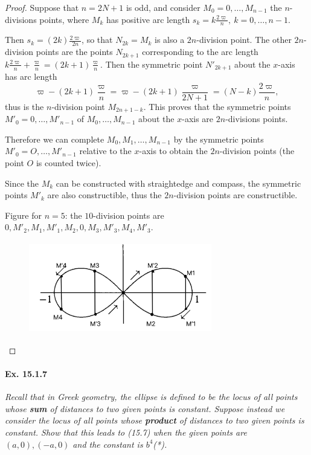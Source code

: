\documentclass[11pt,a4paper]{article}
\begin{document}
\begin{proof} Suppose that $n = 2N+1$ is odd, and consider $M_0=0, \ldots,M_{n-1}$  the $n$-divisions points, where $M_k$ has positive arc length $s_k = k \frac{2\varpi}{n},\ k=0,\ldots,n-1$.

Then $s_k = (2k) \frac{2\varpi}{2n}$, so that $N_{2k} = M_k$ is also a $2n$-division point. The other $2n$-division points are the points $N_{2k+1}$ corresponding to the arc length $k \frac{2\varpi}{n} + \frac{\varpi}{n} = (2k+1) \frac{\varpi}{n}$. Then the symmetric point $N'_{2k+1}$ about the $x$-axis has arc length 
$$\varpi - (2k+1) \frac{\varpi}{n} = \varpi - (2k+1) \frac{\varpi}{2N+1} = (N-k) \frac{2 \varpi}{n},$$
thus is the $n$-division point $M_{2n+1-k}$. This proves that the symmetric points $M'_0 = 0,\ldots,M'_{n-1}$  of $M_0,\ldots,M_{n-1}$ about the $x$-axis are $2n$-divisions points.


Therefore we can complete $M_0, M_1, \ldots,M_{n-1}$ by the symmetric points $M'_0 = O,\ldots,M'_{n-1}$ relative to the $x$-axis to obtain the $2n$-division points (the point $O$ is counted twice).

Since the $M_k$ can be constructed with straightedge and compass, the symmetric points $M'_k$ are also constructible, thus the $2n$-division points are constructible. 

Figure for $n=5$: the $10$-division points are $0,M'_2,M_1,M'_1,M_2,0,M_3,M'_3,M_4,M'_3$.
\begin{figure}[htbp]
\begin{center}
\includegraphics [width=8cm,height=4cm] {lemniscate.png}
\end{center}
\end{figure}
\end{proof}

\paragraph{Ex. 15.1.7}{\it Recall that in Greek geometry, the ellipse is defined to be the locus of all points whose {\bf sum} of distances to two given points is constant. Suppose instead we consider the locus of all points whose {\bf product} of distances to two given points is constant. Show that this leads to (15.7) when the given points are $(a,0),(-a,0)$ and the constant is $b^4$(*).
}
\end{document}
